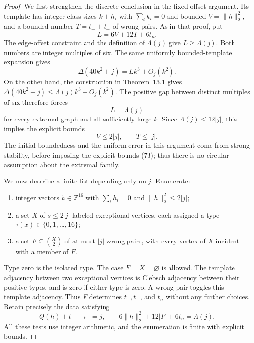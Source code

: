 \documentclass[11pt]{amsart}
\theoremstyle{definition}
\theoremstyle{remark}
\begin{document}
\begin{proof}
We first strengthen the discrete conclusion in the fixed-offset
argument. Its template has integer class sizes $k+h_i$ with
$\sum_i h_i=0$ and bounded $V=\lVert h\rVert_2^2$, and a bounded number
$T=t_++t_-$ of wrong pairs. As in that proof, put
\[
 L=6V+12T+6t_n.
\]
The edge-offset constraint and the definition of $\Lambda(j)$ give
$L\geq\Lambda(j)$. Both numbers are integer multiples of six. The same
uniformly bounded-template expansion gives
\[
 \Delta(40k^2+j)=Lk^3+O_j(k^2).
\]
On the other hand, the construction in Theorem~13.1 gives
$\Delta(40k^2+j)\leq\Lambda(j)k^3+O_j(k^2)$. The positive gap between
distinct multiples of six therefore forces
\begin{equation}\tag{72}\label{eq:energy-equality}
 L=\Lambda(j)
\end{equation}
for every extremal graph and all sufficiently large $k$. Since
$\Lambda(j)\leq12|j|$, this implies the explicit bounds
\begin{equation}\tag{73}\label{eq:explicit-discrete-bounds}
 V\leq2|j|,\qquad T\leq|j|.
\end{equation}
The initial boundedness and the uniform error in this argument come
from strong stability, before imposing the explicit bounds (73); thus
there is no circular assumption about the extremal family.

We now describe a finite list depending only on $j$. Enumerate:
\begin{enumerate}
\item integer vectors $h\in\mathbb Z^{16}$ with $\sum_i h_i=0$ and
      $\lVert h\rVert_2^2\leq2|j|$;
\item a set $X$ of $s\leq2|j|$ labeled exceptional vertices, each
      assigned a type $\tau(x)\in\{0,1,\ldots,16\}$;
\item a set $F\subseteq\binom{X}{2}$ of at most $|j|$ wrong pairs, with
      every vertex of $X$ incident with a member of $F$.
\end{enumerate}
Type zero is the isolated type. The case $F=X=\varnothing$ is allowed.
The template adjacency between two exceptional vertices is Clebsch
adjacency between their positive types, and is zero if either type is
zero. A wrong pair toggles this template adjacency. Thus $F$ determines
$t_+,t_-$, and $t_n$ without any further choices. Retain precisely the
data satisfying
\begin{equation}\tag{74}\label{eq:admissible-data}
 Q(h)+t_+-t_-=j,\qquad
 6\lVert h\rVert_2^2+12|F|+6t_n=\Lambda(j).
\end{equation}
All these tests use integer arithmetic, and the enumeration is finite
with explicit bounds.


\end{proof}
\end{document}
